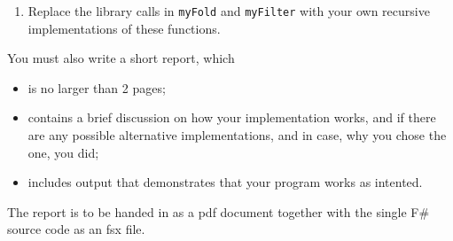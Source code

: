 \begin{enumerate}
\item Replace the library calls in \lstinline{myFold} and
  \lstinline{myFilter} with your own recursive implementations of
  these functions.
\end{enumerate}
You must also write a short report, which 
\begin{itemize}
\item is no larger than 2 pages;
\item contains a brief discussion on how your implementation works,
  and if there are any possible alternative implementations, and in
  case, why you chose the one, you did;
\item includes output that demonstrates that your program works as intented.
\end{itemize}
The report is to be handed in as a pdf document together with the
single F\# source code as an fsx file.
